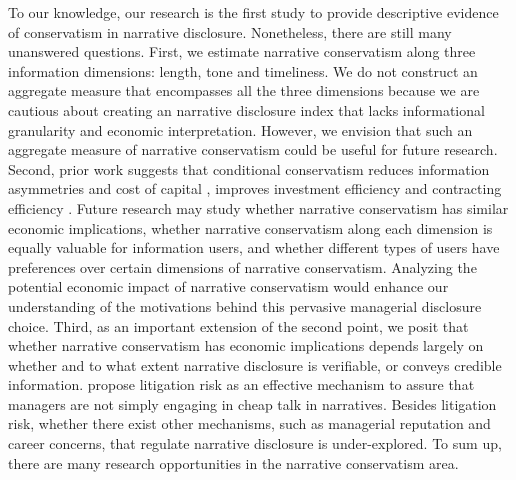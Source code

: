 \documentclass[letterpaper,12pt]{article}
\begin{document}
\begin{spacing}{1.5}
To our knowledge, our research is the first study to provide descriptive evidence of conservatism in narrative disclosure. Nonetheless, there are still many unanswered questions. First, we estimate narrative conservatism along three information dimensions: length, tone and timeliness. We do not construct an aggregate measure that encompasses all the three dimensions because we are cautious about creating an narrative disclosure index that lacks informational granularity and economic interpretation. However, we envision that such an aggregate measure of narrative conservatism could be useful for future research. Second, prior work suggests that conditional conservatism reduces information asymmetries \cite{lafondInformationRoleConservatism2008, garcialaraInformationConsequencesAccounting2014} and cost of capital \cite{suijsValueRelevanceAsymmetric2008, garcialaraConditionalConservatismCost2011, guayConservativeDisclosure2018}, improves investment efficiency \cite{francisAcquisitionProfitabilityTimely2010, bushmanCapitalAllocationTimely2011, garcialaraAccountingConservatismFirm2016} and contracting efficiency \cite{wattsPositiveAccountingTheory1986, wattsConservatismAccountingPart2003, kothariImplicationsGAAPAnalysis2010}. Future research may study whether narrative conservatism has similar economic implications, whether narrative conservatism along each dimension is equally valuable for information users, and whether different types of users have preferences over certain dimensions of narrative conservatism. Analyzing the potential economic impact of narrative conservatism would enhance our understanding of the motivations behind this pervasive managerial disclosure choice. Third, as an important extension of the second point, we posit that whether narrative conservatism has economic implications depends largely on whether and to what extent narrative disclosure is verifiable, or conveys credible information.  propose litigation risk as an effective mechanism to assure that managers are not simply engaging in cheap talk in narratives. Besides litigation risk, whether there exist other mechanisms, such as managerial reputation and career concerns, that regulate narrative disclosure is under-explored. To sum up, there are many research opportunities in the narrative conservatism area.

\end{spacing}

\newpage



\newpage


\newpage


\newpage


\newpage
\setcounter{page}{1}

\end{document}
